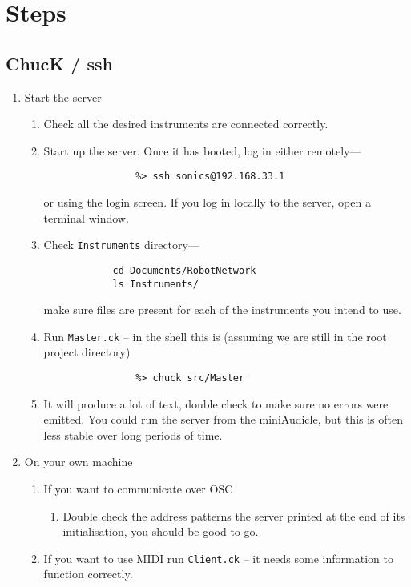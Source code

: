 \documentclass[11pt]{article}
\begin{document}
\section{Steps}

\subsection{ChucK / ssh}
\begin{enumerate} [\bf 1.]
\item {\large Start the server}
	\begin{enumerate} [\bf i.]

		\item{Check all the desired instruments are connected correctly.}
		\item{Start up the server. Once it has booted, log in either remotely---
		\begin{verbatim}
			    %> ssh sonics@192.168.33.1
		\end{verbatim}                                 
		or using the login screen. If you log in locally to the server, open a terminal window.}
		\item{Check \texttt{Instruments} directory---
		\begin{verbatim}
			cd Documents/RobotNetwork 
			ls Instruments/
		\end{verbatim}
		make sure files are present for each of the instruments you intend to use.}
		\item Run \texttt{Master.ck} -- in the shell this is (assuming we are still in the root project directory)
		\begin{verbatim}
			    %> chuck src/Master
		\end{verbatim}
		\item  It will produce a lot of text, double check to make sure no errors were emitted. You could run the 
			  server from the miniAudicle, but this is often less stable over long periods of time.
	\end{enumerate}
\item {\large On your own machine}
	\begin{enumerate} [\bf i.]
		\item {If you want to communicate over OSC}
		\begin{enumerate} [\bf a.]
			\item{Double check the address patterns the server printed at the end of its initialisation, you should be good to go.}
		\end{enumerate}
		\item {If you want to use MIDI run \texttt{Client.ck} -- it needs some information to function correctly.
}
\end{enumerate}
\end{enumerate}
\end{document}
